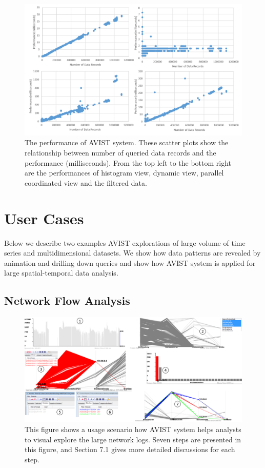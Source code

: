 \documentclass[journal]{vgtc}                %
\begin{document}
{\begin{figure}[htb]
	\centering
	\includegraphics[width=1.0\linewidth]{pic/performance.png}
	\parbox[t]{1.0\columnwidth}{\relax
	}
	\caption{\label{fig:performance}
		The performance of AVIST system. These scatter plots show the relationship between number of queried data records and the performance (milliseconds). From the top left to the bottom right are the performances of histogram view, dynamic view, parallel coordinated view and the filtered data.  }
\end{figure}

\section{User Cases}
Below we describe two examples AVIST explorations of large volume of time series and multidimensional datasets. We show how data patterns are revealed by animation and drilling down queries and show how AVIST system is applied for large spatial-temporal data analysis.

\subsection{Network Flow Analysis} %

\begin{figure}[htb]
	\centering
	\includegraphics[width=1.0\linewidth]{pic/network2.png}
	\parbox[t]{1.0\columnwidth}{\relax
	}
	\caption{\label{fig:network}
		This figure shows a usage scenario how AVIST system helps analysts to visual explore the large network logs. 
		Seven steps are presented in this figure, and Section 7.1 gives more detailed discussions for each step. }
\end{figure}

}
\end{document}
